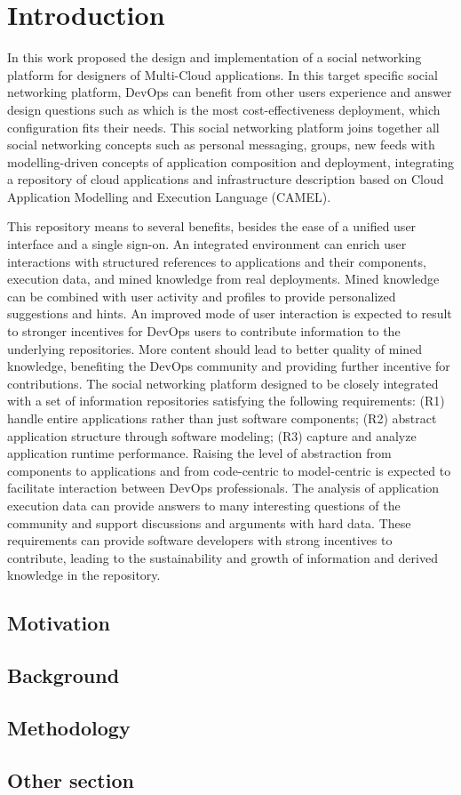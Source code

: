 \chapter{Introduction}
In this work proposed the design and implementation of a social networking platform for designers of Multi-Cloud applications. In this target specific social networking platform, DevOps can benefit from other users experience and answer design questions such as which is the most cost-effectiveness deployment, which configuration fits their needs. This social networking platform joins together all social networking concepts such as personal messaging, groups, new feeds with modelling-driven concepts of application composition and deployment, integrating a repository of cloud applications and infrastructure description based on Cloud Application Modelling and Execution Language (CAMEL). 

This repository means to several benefits, besides the ease of a unified user interface and a single sign-on. An integrated environment can enrich user interactions with structured references to applications and their components, execution data, and mined knowledge from real deployments. Mined knowledge can be combined with user activity and profiles to provide personalized suggestions and hints.  An improved mode of user interaction is expected to result to stronger incentives for DevOps users to contribute information to the underlying repositories. More content should lead to better quality of mined knowledge, benefiting the DevOps community and providing further incentive for contributions.  The social networking platform designed to be closely integrated with a set of information repositories satisfying the following requirements: 
(R1) handle entire applications rather than just software components; (R2) abstract application structure through software modeling; (R3) capture and analyze application runtime performance. Raising the level of abstraction from components to applications and from code-centric to model-centric is expected to facilitate interaction between DevOps professionals. The analysis of application execution data can provide answers to many interesting questions of the community and
support discussions and arguments with hard data. 
These requirements can provide software developers with strong incentives to contribute, leading to the sustainability and growth of information and derived knowledge in the repository.

\section{Motivation}

\section{Background}

\section{Methodology}

\section{Other section}

